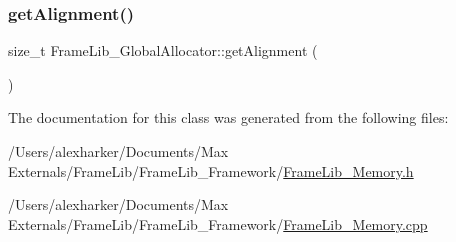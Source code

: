 \subsubsection{\texorpdfstring{get\+Alignment()}{getAlignment()}}
{\footnotesize\ttfamily size\+\_\+t Frame\+Lib\+\_\+\+Global\+Allocator\+::get\+Alignment (\begin{DoxyParamCaption}{ }\end{DoxyParamCaption})\hspace{0.3cm}{\ttfamily [static]}}



The documentation for this class was generated from the following files\+:\begin{DoxyCompactItemize}
\item 
/\+Users/alexharker/\+Documents/\+Max Externals/\+Frame\+Lib/\+Frame\+Lib\+\_\+\+Framework/\hyperlink{_frame_lib___memory_8h}{Frame\+Lib\+\_\+\+Memory.\+h}\item 
/\+Users/alexharker/\+Documents/\+Max Externals/\+Frame\+Lib/\+Frame\+Lib\+\_\+\+Framework/\hyperlink{_frame_lib___memory_8cpp}{Frame\+Lib\+\_\+\+Memory.\+cpp}\end{DoxyCompactItemize}
